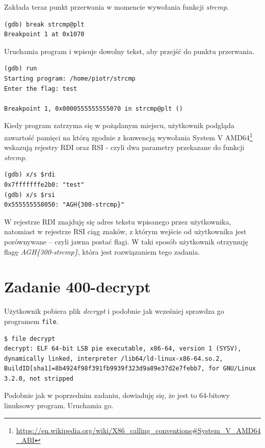 \documentclass[language=polish,type=eng]{aghmodern}
\begin{document}
Zakłada teraz punkt przerwania w momencie wywołania funkcji \emph{strcmp}.

\begin{verbatim}
(gdb) break strcmp@plt
Breakpoint 1 at 0x1070
\end{verbatim}

Uruchamia program i wpisuje dowolny tekst, aby przejść do punktu przerwania.

\begin{verbatim}
(gdb) run
Starting program: /home/piotr/strcmp 
Enter the flag: test

Breakpoint 1, 0x0000555555555070 in strcmp@plt ()
\end{verbatim}

Kiedy program zatrzyma się w pożądanym miejscu, użytkownik podgląda zawartość pamięci na którą
zgodnie z konwencją wywołania System V AMD64\footnote{
\url{https://en.wikipedia.org/wiki/X86_calling_conventions\#System_V_AMD64_ABI}}
wskazują rejestry RDI oraz RSI - czyli dwa parametry przekazane do funkcji \emph{strcmp}.

\begin{verbatim}
(gdb) x/s $rdi
0x7fffffffe2b0: "test"
(gdb) x/s $rsi
0x555555558050: "AGH{300-strcmp}"
\end{verbatim}

W rejestrze RDI znajduję się adres tekstu wpisanego przez użytkownika, natomiast
w rejestrze RSI ciąg znaków, z którym wejście od użytkownika jest porównywane -- czyli
jawna postać flagi. W taki sposób użytkownik otrzymuję flagę \emph{AGH\{300-strcmp\}},
która jest rozwiązaniem tego zadania.

\section{Zadanie 400-decrypt}

Użytkownik pobiera plik \emph{decrypt} i podobnie jak wcześniej
sprawdza go programem \texttt{file}.

\begin{verbatim}
$ file decrypt
decrypt: ELF 64-bit LSB pie executable, x86-64, version 1 (SYSV), dynamically linked, interpreter /lib64/ld-linux-x86-64.so.2, BuildID[sha1]=8b4924f98f391fb9939f323d9a89e37d2e7febb7, for GNU/Linux 3.2.0, not stripped
\end{verbatim}

Podobnie jak w poprzednim zadaniu, dowiaduję się, że jest to 64-bitowy linuksowy program.
Uruchamia go.
\end{document}
